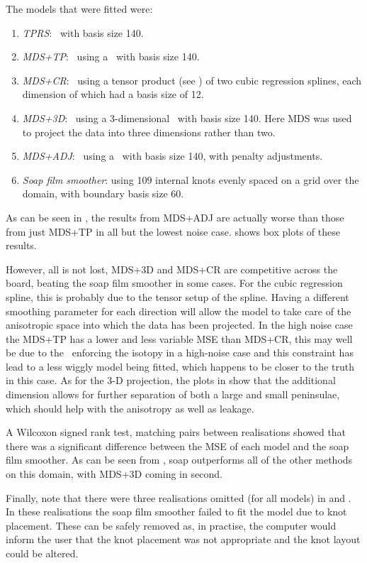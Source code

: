 {The models that were fitted were:
\begin{enumerate}
\item \emph{TPRS}: \tprs\ with basis size 140.
\item \emph{MDS+TP}: \mdsap\ using a \tprs\ with basis size 140.
\item \emph{MDS+CR}: \mdsap\ using a tensor product (see ) of two cubic regression splines, each dimension of which had a basis size of 12.
\item \emph{MDS+3D}: \mdsap\ using a 3-dimensional \tprs\ with basis size 140. Here MDS was used to project the data into three dimensions rather than two.
\item \emph{MDS+ADJ}: \mdsap\ using a \tprs\ with basis size 140, with penalty adjustments.
\item \emph{Soap film smoother}: using 109 internal knots evenly spaced on a grid over the domain, with boundary basis size 60.
\end{enumerate}

As can be seen in , the results from MDS+ADJ are actually worse than those from just MDS+TP in all but the lowest noise case.  shows box plots of these results.

However, all is not lost, MDS+3D and MDS+CR are competitive across the board, beating the soap film smoother in some cases. For the cubic regression spline, this is probably due to the tensor setup of the spline. Having a different smoothing parameter for each direction will allow the model to take care of the anisotropic space into which the data has been projected. In the high noise case the MDS+TP has a lower and less variable MSE than MDS+CR, this may well be due to the \tprs\ enforcing the isotopy in a high-noise case and this constraint has lead to a less wiggly model being fitted, which happens to be closer to the truth in this case. As for the 3-D projection, the plots in  show that the additional dimension allows for further separation of both a large and small peninsulae, which should help with the anisotropy as well as leakage.

A Wilcoxon signed rank test, matching pairs between realisations showed that there was a significant difference between the MSE of each model and the soap film smoother. As can be seen from , soap outperforms all of the other methods on this domain, with MDS+3D coming in second. 

Finally, note that there were three realisations omitted (for all models) in  and . In these realisations the soap film smoother failed to fit the model due to knot placement. These can be safely removed as, in practise, the computer would inform the user that the knot placement was not appropriate and the knot layout could be altered.

}
